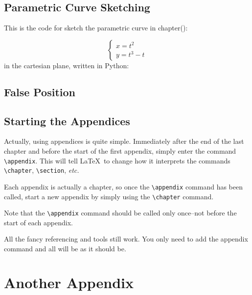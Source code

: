 \documentclass[12pt]{report}
\begin{document}
\section{Parametric Curve Sketching}
This is the code for sketch the parametric curve in chapter():

$$
\left\{\begin{array}{ll}
x = t^2 
\\ y = t^3 - t
\end{array}\right.
$$ in the cartesian plane, written in Python:



\section{False Position}



\section{Starting the Appendices}
Actually, using appendices is quite simple.  Immediately after the end
of the last chapter and before the start of the first appendix, simply
enter the command \verb|\appendix|.  This will tell \LaTeX~to change
how it interprets the commands \verb|\chapter|, \verb|\section|,
\textit{etc.}

Each appendix is actually a chapter, so once the \verb|\appendix|
command has been called, start a new appendix by simply using the
\verb|\chapter| command.

Note that the \verb|\appendix| command should be called only
once--not before the start of each appendix.

All the fancy referencing and tools still work.
You only need to add the appendix command and all will be as it should be.

\chapter{Another Appendix}
\end{document}
